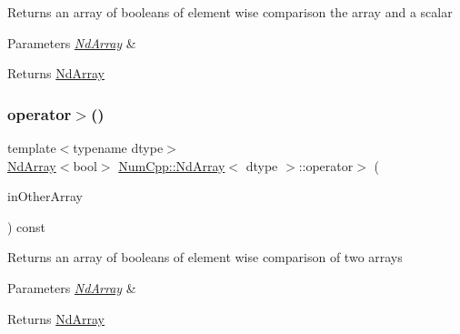 Returns an array of booleans of element wise comparison the array and a scalar


\begin{DoxyParams}{Parameters}
{\em \mbox{\hyperlink{class_num_cpp_1_1_nd_array}{Nd\+Array}}} & \\
\hline
\end{DoxyParams}
\begin{DoxyReturn}{Returns}
\mbox{\hyperlink{class_num_cpp_1_1_nd_array}{Nd\+Array}} 
\end{DoxyReturn}
\mbox{\label{class_num_cpp_1_1_nd_array_adec05f9b335ef7d015827de174a76dc7}} 
\subsubsection{\texorpdfstring{operator$>$()}{operator>()}\hspace{0.1cm}{\footnotesize\ttfamily [2/2]}}
{\footnotesize\ttfamily template$<$typename dtype$>$ \\
\mbox{\hyperlink{class_num_cpp_1_1_nd_array}{Nd\+Array}}$<$bool$>$ \mbox{\hyperlink{class_num_cpp_1_1_nd_array}{Num\+Cpp\+::\+Nd\+Array}}$<$ dtype $>$\+::operator$>$ (\begin{DoxyParamCaption}\item[{const \mbox{\hyperlink{class_num_cpp_1_1_nd_array}{Nd\+Array}}$<$ dtype $>$ \&}]{in\+Other\+Array }\end{DoxyParamCaption}) const\hspace{0.3cm}{\ttfamily [inline]}}

Returns an array of booleans of element wise comparison of two arrays


\begin{DoxyParams}{Parameters}
{\em \mbox{\hyperlink{class_num_cpp_1_1_nd_array}{Nd\+Array}}} & \\
\hline
\end{DoxyParams}
\begin{DoxyReturn}{Returns}
\mbox{\hyperlink{class_num_cpp_1_1_nd_array}{Nd\+Array}} 
\end{DoxyReturn}
\mbox{\label{class_num_cpp_1_1_nd_array_a1f4ae1fe7ae8c5d9d42310a6da4eda9d}} 
